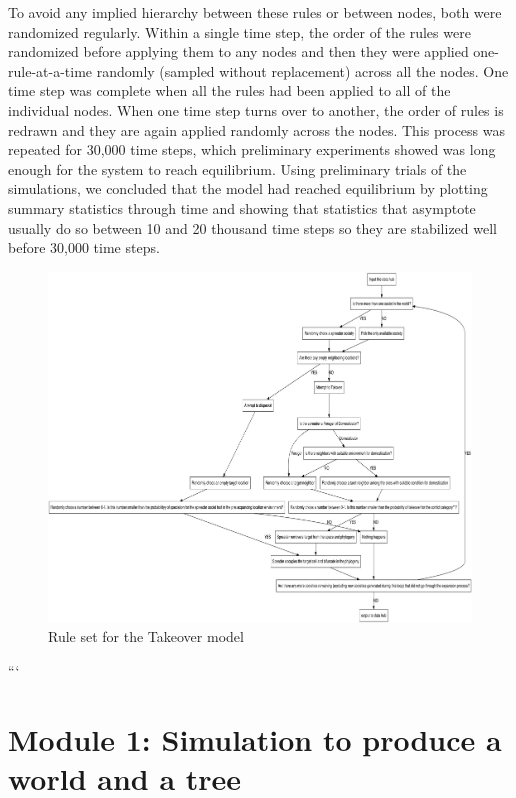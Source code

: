 \documentclass[]{book}
\theoremstyle{definition}
\theoremstyle{definition}
\theoremstyle{definition}
\theoremstyle{remark}
\begin{document}
To avoid any implied hierarchy between these rules or between nodes,
both were randomized regularly. Within a single time step, the order of
the rules were randomized before applying them to any nodes and then
they were applied one-rule-at-a-time randomly (sampled without
replacement) across all the nodes. One time step was complete when all
the rules had been applied to all of the individual nodes. When one time
step turns over to another, the order of rules is redrawn and they are
again applied randomly across the nodes. This process was repeated for
30,000 time steps, which preliminary experiments showed was long enough
for the system to reach equilibrium. Using preliminary trials of the
simulations, we concluded that the model had reached equilibrium by
plotting summary statistics through time and showing that statistics
that asymptote usually do so between 10 and 20 thousand time steps so
they are stabilized well before 30,000 time steps.

\begin{figure}
\centering
\includegraphics{stnds.qa.png}
\caption{Rule set for the Takeover model}
\end{figure}

```

\chapter{Module 1: Simulation to produce a world and a
tree}\label{module-1-simulation-to-produce-a-world-and-a-tree}
\end{document}
